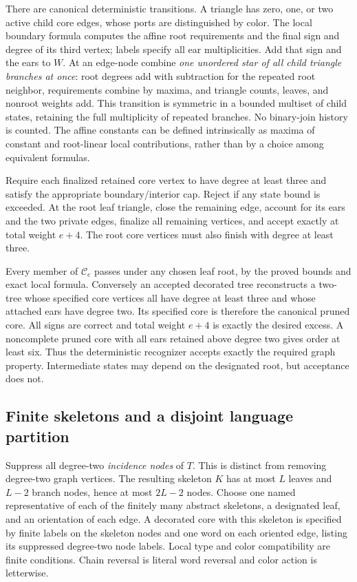 There are canonical deterministic transitions.  A triangle has zero,
one, or two active child core edges, whose ports are distinguished
by color.  The local boundary formula computes the affine root
requirements and the final sign and degree of its third vertex;
labels specify all ear multiplicities.  Add that sign and the ears
to $W$.  At an edge-node combine \emph{one unordered star of all
child triangle branches at once}: root degrees add with subtraction
for the repeated root neighbor, requirements combine by maxima,
and triangle counts, leaves, and nonroot weights add.  This transition
is symmetric in a bounded multiset of child states, retaining the
full multiplicity of repeated branches.  No binary-join history is
counted.  The affine constants can be defined intrinsically as
maxima of constant and root-linear local contributions, rather
than by a choice among equivalent formulas.

Require each finalized retained core vertex to have degree at least
three and satisfy the appropriate boundary/interior cap.  Reject if
any state bound is exceeded.  At the root leaf triangle, close the
remaining edge, account for its ears and the two private edges,
finalize all remaining vertices, and accept exactly at total weight
$e+4$.  The root core vertices must also finish with degree at least
three.

Every member of $\mathcal C_e$ passes under any chosen leaf root,
by the proved bounds and exact local formula.  Conversely an accepted
decorated tree reconstructs a two-tree whose specified core vertices
all have degree at least three and whose attached ears have degree
two.  Its specified core is therefore the canonical pruned core.
All signs are correct and total weight $e+4$ is exactly the desired
excess.  A noncomplete pruned core with all ears retained above degree
two gives order at least six.  Thus the deterministic recognizer
accepts exactly the required graph property.  Intermediate states
may depend on the designated root, but acceptance does not.

\subsection{Finite skeletons and a disjoint language partition}

Suppress all degree-two \emph{incidence nodes} of $T$.  This is
distinct from removing degree-two graph vertices.  The resulting
skeleton $K$ has at most $L$ leaves and $L-2$ branch nodes, hence
at most $2L-2$ nodes.  Choose one named representative of each of
the finitely many abstract skeletons, a designated leaf, and an
orientation of each edge.  A decorated core with this skeleton is
specified by finite labels on the skeleton nodes and one word on
each oriented edge, listing its suppressed degree-two node labels.
Local type and color compatibility are finite conditions.  Chain
reversal is literal word reversal and color action is letterwise.

